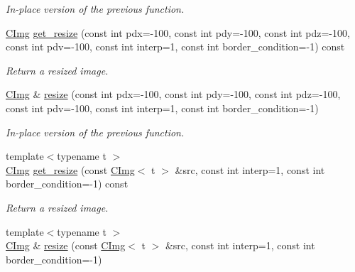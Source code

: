 \begin{DoxyCompactItemize}
\begin{DoxyCompactList}\small\item\em In-\/place version of the previous function. \end{DoxyCompactList}\item 
\hyperlink{structcimg__library_1_1_c_img}{C\-Img} \hyperlink{structcimg__library_1_1_c_img_ababc8a96d142815637c32afbd9df9e48}{get\-\_\-resize} (const int pdx=-\/100, const int pdy=-\/100, const int pdz=-\/100, const int pdv=-\/100, const int interp=1, const int border\-\_\-condition=-\/1) const 
\begin{DoxyCompactList}\small\item\em Return a resized image. \end{DoxyCompactList}\item 
\hypertarget{structcimg__library_1_1_c_img_a84970d569f01fc5f9370d9cc84428903}{\hyperlink{structcimg__library_1_1_c_img}{C\-Img} \& \hyperlink{structcimg__library_1_1_c_img_a84970d569f01fc5f9370d9cc84428903}{resize} (const int pdx=-\/100, const int pdy=-\/100, const int pdz=-\/100, const int pdv=-\/100, const int interp=1, const int border\-\_\-condition=-\/1)}\label{structcimg__library_1_1_c_img_a84970d569f01fc5f9370d9cc84428903}

\begin{DoxyCompactList}\small\item\em In-\/place version of the previous function. \end{DoxyCompactList}\item 
{\footnotesize template$<$typename t $>$ }\\\hyperlink{structcimg__library_1_1_c_img}{C\-Img} \hyperlink{structcimg__library_1_1_c_img_a539206399cdbe7b6a960af0972d9a335}{get\-\_\-resize} (const \hyperlink{structcimg__library_1_1_c_img}{C\-Img}$<$ t $>$ \&src, const int interp=1, const int border\-\_\-condition=-\/1) const 
\begin{DoxyCompactList}\small\item\em Return a resized image. \end{DoxyCompactList}\item 
\hypertarget{structcimg__library_1_1_c_img_a1409b618eb28c852f8bf8f971ef2949b}{{\footnotesize template$<$typename t $>$ }\\\hyperlink{structcimg__library_1_1_c_img}{C\-Img} \& \hyperlink{structcimg__library_1_1_c_img_a1409b618eb28c852f8bf8f971ef2949b}{resize} (const \hyperlink{structcimg__library_1_1_c_img}{C\-Img}$<$ t $>$ \&src, const int interp=1, const int border\-\_\-condition=-\/1)}\label{structcimg__library_1_1_c_img_a1409b618eb28c852f8bf8f971ef2949b}


\end{DoxyCompactItemize}
